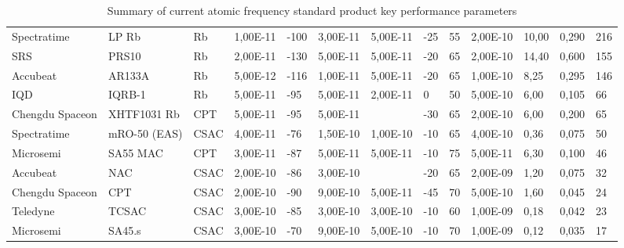 \begin{table}
\begin{tabular}{ll|lllllllllll}
        Spectratime     & LP Rb            & Rb            & 1,00E-11      & -100                   & 3,00E-11       & 5,00E-11         & -25           & 55            & 2,00E-10        & 10,00          & 0,290           & 216           \\
        SRS             & PRS10            & Rb            & 2,00E-11      & -130                   & 5,00E-11       & 5,00E-11         & -20           & 65            & 2,00E-10        & 14,40          & 0,600           & 155           \\
        Accubeat        & AR133A           & Rb            & 5,00E-12      & -116                   & 1,00E-11       & 5,00E-11         & -20           & 65            & 1,00E-10        & 8,25           & 0,295           & 146           \\
        IQD             & IQRB-1           & Rb            & 5,00E-11      & -95                    & 5,00E-11       & 2,00E-11         & 0             & 50            & 5,00E-10        & 6,00           & 0,105           & 66            \\
        Chengdu Spaceon & XHTF1031 Rb      & CPT           & 5,00E-11      & -95                    & 5,00E-11       & ~                & -30           & 65            & 2,00E-10        & 6,00           & 0,200           & 65            \\
        Spectratime     & mRO-50 (EAS)     & CSAC          & 4,00E-11      & -76                    & 1,50E-10       & 1,00E-10         & -10           & 65            & 4,00E-10        & 0,36           & 0,075           & 50            \\
        Microsemi       & SA55 MAC         & CPT           & 3,00E-11      & -87                    & 5,00E-11       & 5,00E-11         & -10           & 75            & 5,00E-11        & 6,30           & 0,100           & 46            \\
        Accubeat        & NAC              & CSAC          & 2,00E-10      & -86                    & 3,00E-10       & ~                & -20           & 65            & 2,00E-09        & 1,20           & 0,075           & 32            \\
        Chengdu Spaceon & CPT              & CSAC          & 2,00E-10      & -90                    & 9,00E-10       & 5,00E-11         & -45           & 70            & 5,00E-10        & 1,60           & 0,045           & 24            \\
        Teledyne        & TCSAC            & CSAC          & 3,00E-10      & -85                    & 3,00E-10       & 3,00E-10         & -10           & 60            & 1,00E-09        & 0,18           & 0,042           & 23            \\
        Microsemi       & SA45.s           & CSAC          & 3,00E-10      & -70                    & 9,00E-10       & 5,00E-10         & -10           & 70            & 1,00E-09        & 0,12           & 0,035           & 17            \\
        \hline
    \end{tabular}
    \caption{Summary of current atomic frequency standard product key performance parameters}
\end{table}

